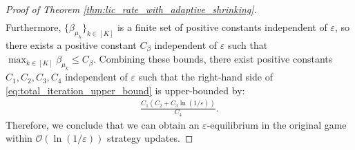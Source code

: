 \documentclass{article}
\theoremstyle{plain}
\begin{document}
\begin{proof}[Proof of Theorem \ref{thm:lic_rate_with_adaptive_shrinking}]
\begin{align*}
    \end{align*}
    Furthermore, $\{\beta_{\mu_k}\}_{k\in [K]}$ is a finite set of positive constants independent of $\varepsilon$, so there exists a positive constant $C_{\beta}$ independent of $\varepsilon$ such that $\max_{k\in [K]}\beta_{\mu_k} \leq C_{\beta}$.
    Combining these bounds, there exist positive constants $C_1, C_2, C_3, C_4$ independent of $\varepsilon$ such that the right-hand side of \eqref{eq:total_iteration_upper_bound} is upper-bounded by:
    \begin{align*}
        \frac{C_1(C_2 + C_3\ln (1/\varepsilon))}{C_4}.
    \end{align*}
    Therefore, we conclude that we can obtain an $\varepsilon$-equilibrium in the original game within $\mathcal{O}(\ln (1/\varepsilon))$ strategy updates.
\end{proof}
\end{document}
